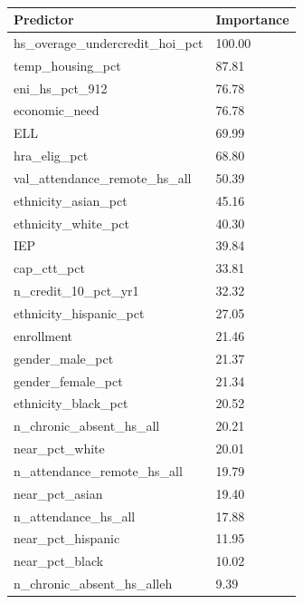 \documentclass[
  man,floatsintext]{apa6}
\begin{document}
\begin{table}[H]

\begin{center}
\begin{threeparttable}

\caption{\label{tab:unnamed-chunk-11}}

\begin{tabular}{ll}
\toprule
Predictor & \multicolumn{1}{c}{Importance}\\
\midrule
hs\_overage\_undercredit\_hoi\_pct & 100.00\\
temp\_housing\_pct & 87.81\\
eni\_hs\_pct\_912 & 76.78\\
economic\_need & 76.78\\
ELL & 69.99\\
hra\_elig\_pct & 68.80\\
val\_attendance\_remote\_hs\_all & 50.39\\
ethnicity\_asian\_pct & 45.16\\
ethnicity\_white\_pct & 40.30\\
IEP & 39.84\\
cap\_ctt\_pct & 33.81\\
n\_credit\_10\_pct\_yr1 & 32.32\\
ethnicity\_hispanic\_pct & 27.05\\
enrollment & 21.46\\
gender\_male\_pct & 21.37\\
gender\_female\_pct & 21.34\\
ethnicity\_black\_pct & 20.52\\
n\_chronic\_absent\_hs\_all & 20.21\\
near\_pct\_white & 20.01\\
n\_attendance\_remote\_hs\_all & 19.79\\
near\_pct\_asian & 19.40\\
n\_attendance\_hs\_all & 17.88\\
near\_pct\_hispanic & 11.95\\
near\_pct\_black & 10.02\\
n\_chronic\_absent\_hs\_alleh & 9.39\\
\bottomrule
\end{tabular}

\end{threeparttable}
\end{center}

\end{table}
\end{document}
